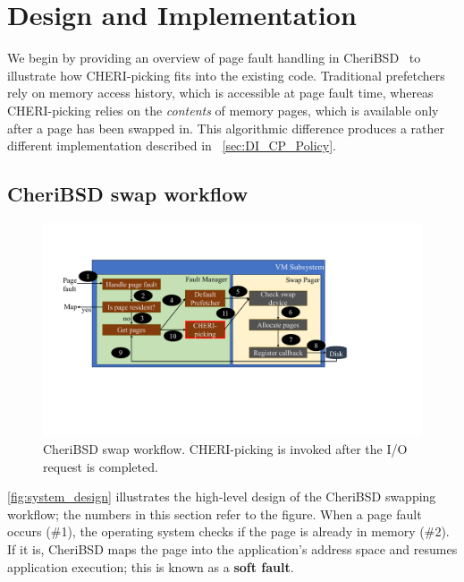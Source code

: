 \section{Design and Implementation} \label{sec:4}

We begin by providing an overview of page fault handling in CheriBSD~\cite{cheribsd} to illustrate how CHERI-picking fits into the existing code. Traditional prefetchers rely on memory access history, which is accessible at page fault time, whereas CHERI-picking relies on the \emph{contents} of memory pages, which is available only after a page has been swapped in. This algorithmic difference produces a rather different implementation described in ~\autoref{sec:DI_CP_Policy}.

\subsection{CheriBSD swap workflow}
\label{sec:DI_swap}

\begin{figure}[]
\centering
\includegraphics[width=\columnwidth]{images/CP_system_design_diagram.pdf}
\caption{CheriBSD swap workflow. 
CHERI-picking is invoked after the I/O request is completed.}
\label{fig:system_design}
\end{figure}

\autoref{fig:system_design} illustrates the high-level design of the CheriBSD swapping workflow; the numbers in this section refer to the figure. 
When a page fault occurs (\#1), the operating system checks if the page is already in memory (\#2). 
If it is, CheriBSD maps the page into the application's address space and resumes application execution; this is known as a \textbf{soft fault}.

